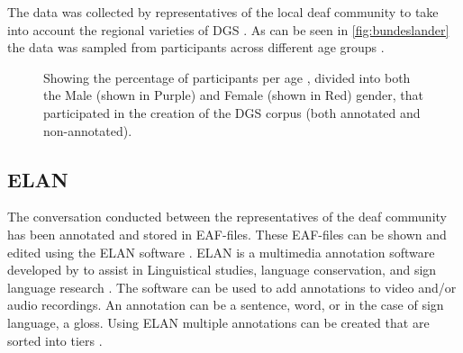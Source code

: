  The data was collected by representatives of the local deaf community to take into account the regional varieties of DGS \cite{deaf_areas}. As can be seen in \autoref{fig:bundeslander} the data was sampled from participants across different age groups \cite{age_data_hamburg}. 


\mydata

\begin{figure}[h]
\caption{Showing the percentage of participants per age , divided into both the Male (shown in Purple) and Female (shown in Red) gender,  that participated in the creation of the DGS corpus (both annotated and non-annotated).  \cite{age_data_hamburg}}

\label{fig:bundeslander}
\end{figure}

\subsection{ELAN}
The conversation conducted between the representatives of the deaf community has been annotated and stored in EAF-files. These EAF-files can be shown and edited using the ELAN software \cite{crasborn2008enhanced}. ELAN is a multimedia annotation software developed by \citep{elan_software} to assist in Linguistical studies, language conservation, and sign language research \cite{brugman2004annotating}. The software can be used to add annotations to video and/or audio recordings. An annotation can be a sentence, word, or in the case of sign language, a gloss. Using ELAN multiple annotations can be created that are sorted into tiers \cite{crasborn2008enhanced}.  

